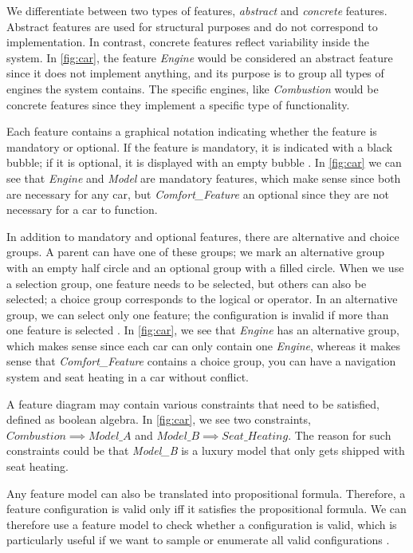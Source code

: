 We differentiate between two types of features, \emph{abstract} and \emph{concrete} features. 
Abstract features are used for structural purposes and do not correspond to implementation. 
In contrast, concrete features reflect variability inside the system.
In \autoref{fig:car}, the feature \textit{Engine} would be considered an abstract feature since it does not implement anything, and its purpose
is to group all types of engines the system contains. The specific engines, like \textit{Combustion} would be concrete features since
they implement a specific type of functionality.

Each feature contains a graphical notation indicating whether the feature is mandatory or optional. 
If the feature is mandatory, it is indicated with a black bubble; if it is optional, it is displayed with an empty bubble \cite{Feature-Oriented-Software-Product-Lines-Feature-models}. 
In \autoref{fig:car} we can see that \textit{Engine} and \textit{Model} are mandatory features, which make sense since both are necessary for any car, 
but \textit{Comfort\_Feature} an optional since they are not necessary for a car to function.

In addition to mandatory and optional features, there are alternative and choice groups. 
A parent can have one of these groups; we mark an alternative group with an empty half circle and an optional group with a filled circle. 
When we use a selection group, one feature needs to be selected, but others can also be selected; a choice group corresponds to the logical or operator. 
In an alternative group, we can select only one feature; the configuration is invalid if more than one feature is selected \cite{Feature-Oriented-Software-Product-Lines-Feature-models}. 
In \autoref{fig:car}, we see that \textit{Engine} has an alternative group, which makes sense since each car can only contain one \textit{Engine}, 
whereas it makes sense that \textit{Comfort\_Feature} contains a choice group, you can have a navigation system and seat heating in a car without conflict.

A feature diagram may contain various constraints that need to be satisfied, defined as boolean algebra. In \autoref{fig:car}, we see two constraints, 
$Combustion \implies Model\_A$ and $Model\_B \implies Seat\_Heating$. The reason for such constraints could be that \textit{Model\_B} 
is a luxury model that only gets shipped with seat heating.

Any feature model can also be translated into propositional formula. Therefore, a
feature configuration is valid only iff it satisfies the propositional formula. We can therefore use a feature model to check whether a configuration 
is valid, which is particularly useful if we want to sample or enumerate all valid configurations \cite{Feature-Oriented-Software-Product-Lines-Feature-models}. 